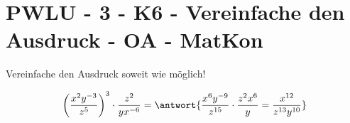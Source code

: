 \section{PWLU - 3 - K6 - Vereinfache den Ausdruck - OA - MatKon}

\begin{beispiel}[PWLU]{1}
Vereinfache den Ausdruck soweit wie möglich!

$$\left(\dfrac{x^2y^{-3}}{z^5}\right)^3\cdot\dfrac{z^2}{yx^{-6}}=\antwort{\dfrac{x^6y^{-9}}{z^{15}}\cdot\dfrac{z^2x^6}{y}=\dfrac{x^{12}}{z^{13}y^{10}}}$$
\end{beispiel}